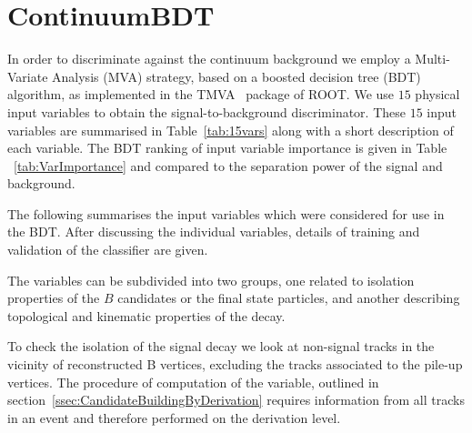 \section{ContinuumBDT}
\label{sec:ContinuumBDT}

In order to discriminate against the continuum background we
employ a Multi-Variate Analysis (MVA) strategy, based on a boosted decision tree (BDT)
algorithm, as implemented in the TMVA~\cite{Hoecker:TMVA} package of ROOT. We use
$15$ physical input variables to obtain the signal-to-background discriminator. These  $15$ input 
variables are summarised in Table~\ref{tab:15vars} along with a short description of each variable.
The BDT ranking of input variable importance is given in Table ~\ref{tab:VarImportance} and compared to 
the separation power of the signal and background.
  
The following summarises the input variables which were considered for use in the
BDT. After discussing the individual variables, details of training and validation
of the classifier are given.
  
The variables can be subdivided into two groups, one related to isolation properties
of the $B$ candidates or the final state particles, and another describing topological
and kinematic properties of the \Bsmumu decay.
  
To check the isolation of the signal decay we look at non-signal tracks in the vicinity
of reconstructed B vertices, excluding the tracks associated to the pile-up vertices.
The procedure of computation of the variable, outlined in section~\ref{ssec:CandidateBuildingByDerivation} 
requires information from all tracks in an event and therefore performed on the derivation level.

  
  
